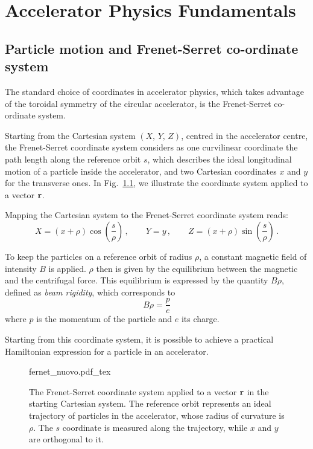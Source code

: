 
\chapter{Accelerator Physics Fundamentals}\label{ch:accelerator_physics_fundamentals}

\section{Particle motion and Frenet-Serret co-ordinate system}

The standard choice of coordinates in accelerator physics, which takes advantage of the toroidal symmetry of the circular accelerator, is the Frenet-Serret co-ordinate system.

Starting from the Cartesian system $(X,\, Y,\, Z)$, centred in the accelerator centre, the Frenet-Serret coordinate system considers as one curvilinear coordinate the path length along the reference orbit $s$, which describes the ideal longitudinal motion of a particle inside the accelerator, and two Cartesian coordinates $x$ and $y$ for the transverse ones. In Fig.~\ref{fig:frenserr}, we illustrate the coordinate system applied to a vector $\vb{r}$.

Mapping the Cartesian system to the Frenet-Serret coordinate system reads:
%
\begin{equation} 
    X = (x+\rho)\cos(\frac{s}{\rho})\,, \qquad Y=y\,, \qquad Z=(x+\rho)\sin(\frac{s}{\rho})\,.
\end{equation}

To keep the particles on a reference orbit of radius $\rho$, a constant magnetic field of intensity $B$ is applied. $\rho$ then is given by the equilibrium between the magnetic and the centrifugal force. This equilibrium is expressed by the quantity $B\rho$, defined as \textit{beam rigidity}, which corresponds to
\begin{equation}
    B\rho = \frac{p}{e}
    \label{eq:beam_rigidity}
\end{equation}
where $p$ is the momentum of the particle and $e$ its charge.

Starting from this coordinate system, it is possible to achieve a practical Hamiltonian expression for a particle in an accelerator.

\begin{figure}
\centering
\def\svgwidth{0.75\columnwidth}
{fernet_nuovo.pdf_tex}
\caption{The Frenet-Serret coordinate system applied to a vector $\vb{r}$ in the starting Cartesian system. The reference orbit represents an ideal trajectory of particles in the accelerator, whose radius of curvature is $\rho$. The $s$ coordinate is measured along the trajectory, while $x$ and $y$ are orthogonal to it.}
\label{fig:frenserr}
\end{figure}

